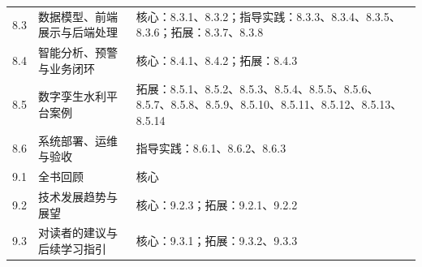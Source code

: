 \begin{longtable}{p{1.2cm}p{4.6cm}p{8.0cm}}
8.3 & 数据模型、前端展示与后端处理 & 核心：8.3.1、8.3.2；指导实践：8.3.3、8.3.4、8.3.5、8.3.6；拓展：8.3.7、8.3.8 \\
8.4 & 智能分析、预警与业务闭环 & 核心：8.4.1、8.4.2；拓展：8.4.3 \\
8.5 & 数字孪生水利平台案例 & 拓展：8.5.1、8.5.2、8.5.3、8.5.4、8.5.5、8.5.6、8.5.7、8.5.8、8.5.9、8.5.10、8.5.11、8.5.12、8.5.13、8.5.14 \\
8.6 & 系统部署、运维与验收 & 指导实践：8.6.1、8.6.2、8.6.3 \\
9.1 & 全书回顾 & 核心 \\
9.2 & 技术发展趋势与展望 & 核心：9.2.3；拓展：9.2.1、9.2.2 \\
9.3 & 对读者的建议与后续学习指引 & 核心：9.3.1；拓展：9.3.2、9.3.3 \\
\bottomrule
\end{longtable}
